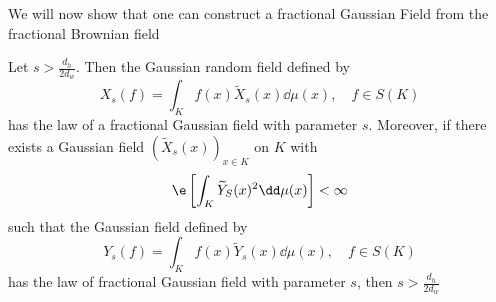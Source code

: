 We will now show that one can construct a fractional Gaussian Field from the fractional Brownian field
\begin{prop}
	Let $s > \frac{d_h}{2d_w}$. Then the Gaussian random field defined by
	\begin{equation}
		X_s(f) = \int_{K}f(x) \widetilde{X}_{s}(x) \dd \mu (x), \quad f \in S(K)
	\end{equation}
	has the law of a fractional Gaussian field with parameter $s$. Moreover, if there exists a Gaussian field $\left(\widetilde{X}_{s}(x)\right)_{x \in K}$ on $K$ with
	\begin{equation}
		\e \left[\int_{K}\widetilde{Y}_S(x)^2 \dd \mu(x)\right] < \infty
	\end{equation}
	such that the Gaussian field defined by
	\begin{equation}
		Y_s(f) = \int_{K}f(x) \widetilde{Y}_{s}(x) \dd \mu (x), \quad f \in S(K)
	\end{equation}
	has the law of fractional Gaussian field with parameter $s$, then $s > \frac{d_h}{2d_w}$
\end{prop}
